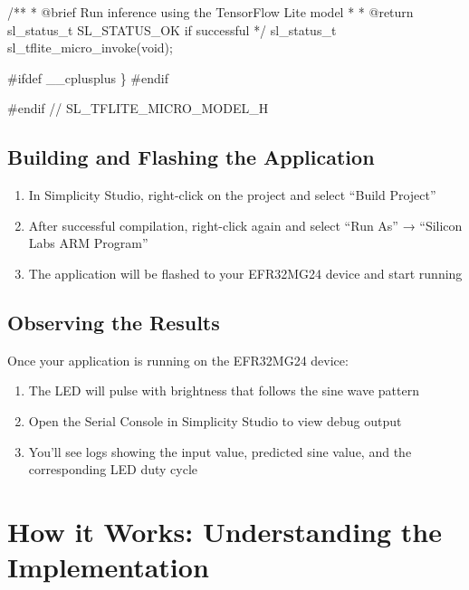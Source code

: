 \documentclass[
  9pt,
  letterpaper,
  abstract,
  titlepage]{scrbook}
\newenvironment{Shaded}{\begin{snugshade}}{\end{snugshade}}
\newcommand{\AnnotationTok}[1]{\textcolor[rgb]{0.37,0.37,0.37}{#1}}
\newcommand{\CommentTok}[1]{\textcolor[rgb]{0.37,0.37,0.37}{#1}}
\newcommand{\DataTypeTok}[1]{\textcolor[rgb]{0.68,0.00,0.00}{#1}}
\newcommand{\NormalTok}[1]{\textcolor[rgb]{0.00,0.23,0.31}{#1}}
\newcommand{\OperatorTok}[1]{\textcolor[rgb]{0.37,0.37,0.37}{#1}}
\newcommand{\PreprocessorTok}[1]{\textcolor[rgb]{0.68,0.00,0.00}{#1}}
\providecommand{\tightlist}{%
  \setlength{\itemsep}{0pt}\setlength{\parskip}{0pt}}\usepackage{longtable,booktabs,array}
\def\tightlist{}
\let\tightlist\relax
\begin{document}
\begin{Shaded}
\begin{Highlighting}[]
\CommentTok{/**}
\CommentTok{ * }\AnnotationTok{@brief}\CommentTok{ Run inference using the TensorFlow Lite model}
\CommentTok{ * }
\CommentTok{ * }\AnnotationTok{@return}\CommentTok{ sl\_status\_t SL\_STATUS\_OK if successful}
\CommentTok{ */}
\NormalTok{sl\_status\_t sl\_tflite\_micro\_invoke}\OperatorTok{(}\DataTypeTok{void}\OperatorTok{);}

\PreprocessorTok{\#ifdef \_\_cplusplus}
\OperatorTok{\}}
\PreprocessorTok{\#endif}

\PreprocessorTok{\#endif }\CommentTok{// SL\_TFLITE\_MICRO\_MODEL\_H}
\end{Highlighting}
\end{Shaded}

\subsection{Building and Flashing the
Application}\label{building-and-flashing-the-application}

\begin{enumerate}
\def\labelenumi{\arabic{enumi}.}
\tightlist
\item
  In Simplicity Studio, right-click on the project and select ``Build
  Project''
\item
  After successful compilation, right-click again and select ``Run As''
  → ``Silicon Labs ARM Program''
\item
  The application will be flashed to your EFR32MG24 device and start
  running
\end{enumerate}

\subsection{Observing the Results}\label{observing-the-results}

Once your application is running on the EFR32MG24 device:

\begin{enumerate}
\def\labelenumi{\arabic{enumi}.}
\tightlist
\item
  The LED will pulse with brightness that follows the sine wave pattern
\item
  Open the Serial Console in Simplicity Studio to view debug output
\item
  You'll see logs showing the input value, predicted sine value, and the
  corresponding LED duty cycle
\end{enumerate}

\section{How it Works: Understanding the
Implementation}\label{how-it-works-understanding-the-implementation}
\end{document}
